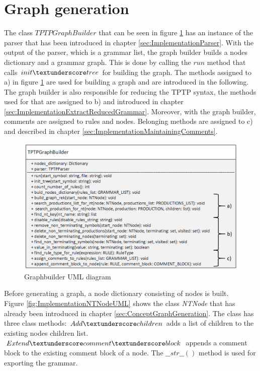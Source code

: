 \section{Graph generation}\label{sec:ImplementationGraphGeneration}

The class $TPTPGraphBuilder$ that can be seen in figure \ref{fig:ImplementationGraphbuilderUML} has an instance of the parser that has been introduced in chapter \ref{sec:ImplementationParser}. With the output of the parser, which is a grammar list, the graph builder builds a nodes dictionary and a grammar graph. This is done by calling the $run$ method that calls $init\textunderscore tree$ for building the graph.
The methods assigned to a) in figure \ref{fig:ImplementationGraphbuilderUML} are used for building a graph and are introduced in the following. The graph builder is also responsible for reducing the \ac{TPTP} syntax, the methods used for that are assigned to b) and introduced in chapter \ref{sec:ImplementationExtractReducedGrammar}. Moreover, with the graph builder, comments are assigned to rules and nodes. Belonging methods are assigned to c) and described in chapter \ref{sec:ImplementationMaintainingComments}.

\begin{figure}[H]
\centering
\includegraphics[width=1 \textwidth]{images/uml_graphbuilderNEW.png}
\caption{Graphbuilder UML diagram}
\label{fig:ImplementationGraphbuilderUML}
\end{figure}                
               
Before generating a graph, a node dictionary consisting of nodes is built.\\
Figure \ref{fig:ImplementationNTNodeUML} shows the class \textit{NTNode} that has already been introduced in chapter \ref{sec:ConceptGraphGeneration}. The class has three class methods:
$Add\textunderscore children$ adds a list of children to the existing nodes children list. $Extend\textunderscore comment\textunderscore block$ appends a comment block to the existing comment block of a node. The $\_\_str\_\_()$ method is used for exporting the grammar.

